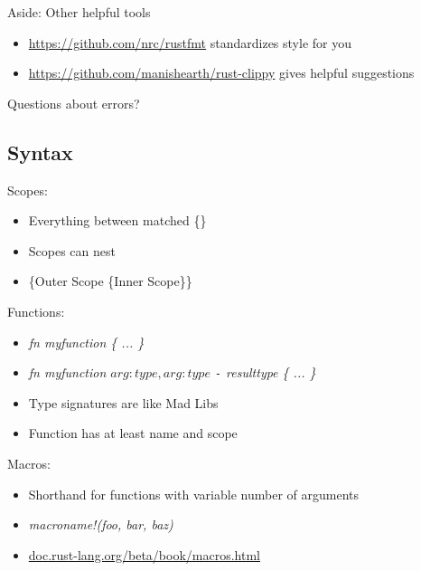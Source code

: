 \documentclass[50pt]{beamer}
\begin{document}
\begin{frame}
    Aside: Other helpful tools
    \begin{itemize}
        \item \url{https://github.com/nrc/rustfmt} standardizes style for you
        \item \url{https://github.com/manishearth/rust-clippy} gives helpful suggestions
    \end{itemize}
\end{frame}

\begin{frame}
    Questions about errors?
\end{frame}


\subsection{Syntax}

\begin{frame}
    Scopes:
    \begin{itemize}
        \item Everything between matched \{\}
        \item Scopes can nest
        \item \{Outer Scope \{Inner Scope\}\}
    \end{itemize}
\end{frame}

\begin{frame}[fragile]
    Functions:
    \begin{itemize}
        \item \textit{ fn myfunction \{ ... \} }
        \item \textit{ fn myfunction \(arg: type, arg: type\) \texttt{-} \textrangle{} resulttype \{ ... \} }
        \item Type signatures are like Mad Libs
        \item Function has at least name and scope
    \end{itemize}
\end{frame}

\begin{frame}[fragile]
    Macros:
    \begin{itemize}
        \item Shorthand for functions with variable number of arguments
        \item \textit{macroname!(foo, bar, baz)}
        \item \url{ doc.rust-lang.org/beta/book/macros.html }
    \end{itemize}
\end{frame}
\end{document}
